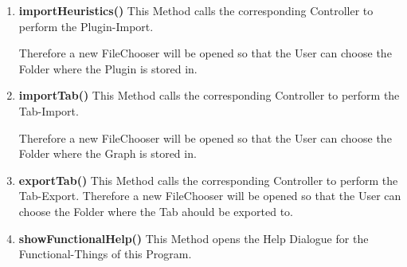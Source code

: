 \documentclass{article}
\begin{document}
				\begin{enumerate}[-]
					\item{
						\textbf{importHeuristics()} \newline
						This Method calls the corresponding Controller to perform the Plugin-Import.
						
						Therefore a new FileChooser will be opened so that the User can choose the Folder where the Plugin is stored in.
						\newline
					}
					\item{
						\textbf{importTab()} \newline
						This Method calls the corresponding Controller to perform the Tab-Import.
						
						Therefore a new FileChooser will be opened so that the User can choose the Folder where the Graph is stored in.
						\newline
					}
					\item{
						\textbf{exportTab()} \newline
						This Method calls the corresponding Controller to perform the Tab-Export.
						Therefore a new FileChooser will be opened so that the User can choose the Folder where the Tab ahould be exported to.
						\newline
					}
					\item{
						\textbf{showFunctionalHelp()} \newline
						This Method opens the Help Dialogue for the Functional-Things of this Program.
						
}
\end{enumerate}
\end{document}

